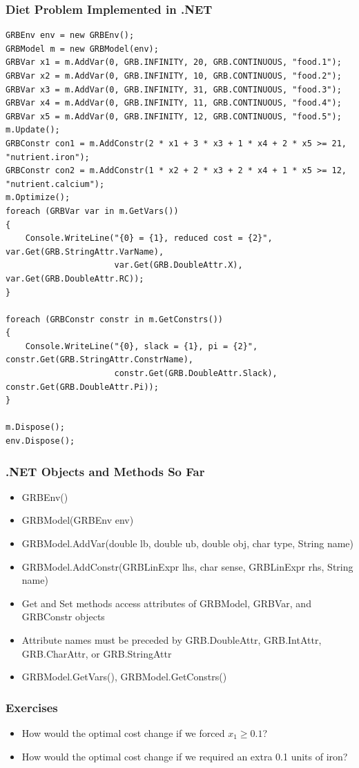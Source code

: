 \documentclass[12pt,handout]{beamer}
\begin{document}
\begin{frame} [containsverbatim]
\frametitle{Diet Problem Implemented in .NET}
\tiny
\begin{verbatim}
GRBEnv env = new GRBEnv();
GRBModel m = new GRBModel(env);
GRBVar x1 = m.AddVar(0, GRB.INFINITY, 20, GRB.CONTINUOUS, "food.1");
GRBVar x2 = m.AddVar(0, GRB.INFINITY, 10, GRB.CONTINUOUS, "food.2");
GRBVar x3 = m.AddVar(0, GRB.INFINITY, 31, GRB.CONTINUOUS, "food.3");
GRBVar x4 = m.AddVar(0, GRB.INFINITY, 11, GRB.CONTINUOUS, "food.4");
GRBVar x5 = m.AddVar(0, GRB.INFINITY, 12, GRB.CONTINUOUS, "food.5");
m.Update();
GRBConstr con1 = m.AddConstr(2 * x1 + 3 * x3 + 1 * x4 + 2 * x5 >= 21, "nutrient.iron");
GRBConstr con2 = m.AddConstr(1 * x2 + 2 * x3 + 2 * x4 + 1 * x5 >= 12, "nutrient.calcium");
m.Optimize();
foreach (GRBVar var in m.GetVars())
{
    Console.WriteLine("{0} = {1}, reduced cost = {2}", var.Get(GRB.StringAttr.VarName),
                      var.Get(GRB.DoubleAttr.X), var.Get(GRB.DoubleAttr.RC));
}

foreach (GRBConstr constr in m.GetConstrs())
{
    Console.WriteLine("{0}, slack = {1}, pi = {2}", constr.Get(GRB.StringAttr.ConstrName),
                      constr.Get(GRB.DoubleAttr.Slack), constr.Get(GRB.DoubleAttr.Pi));
}

m.Dispose();
env.Dispose();
\end{verbatim}
\end{frame}

\begin{frame}
\frametitle{.NET Objects and Methods So Far}
\begin{itemize}
\item GRBEnv()
\item GRBModel(GRBEnv env)
\item GRBModel.AddVar(double lb, double ub, double obj, char type, String name)
\item GRBModel.AddConstr(GRBLinExpr lhs, char sense, GRBLinExpr rhs, String name)
\item Get and Set methods access attributes of GRBModel, GRBVar, and GRBConstr objects
\item Attribute names must be preceded by GRB.DoubleAttr, GRB.IntAttr, GRB.CharAttr, or GRB.StringAttr
\item GRBModel.GetVars(), GRBModel.GetConstrs()
\end{itemize}
\end{frame}

\begin{frame}
\frametitle{Exercises}
\begin{itemize}
\item How would the optimal cost change if we forced $x_1 \ge 0.1$?
\item How would the optimal cost change if we required an extra 0.1 units of iron?
\end{itemize}
\end{frame}
\end{document}
